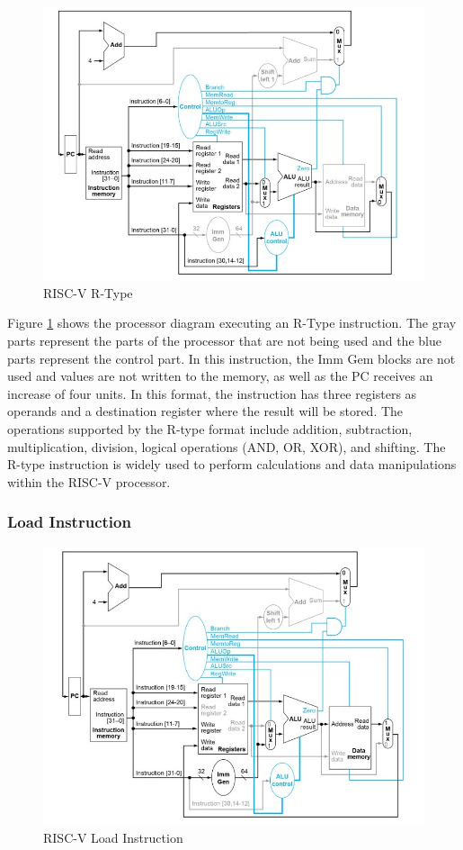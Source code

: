                 \begin{figure}[!h]
                \centering
                \includegraphics[width= 0.8
                \textwidth]{figures/riscv/risc_R-type.jpg}
                    \caption{\label{risc_R-type} RISC-V R-Type}
                \end{figure}
                
                Figure \ref{risc_R-type} shows the processor diagram executing an R-Type instruction. The gray parts represent the parts of the processor that are not being used and the blue parts represent the control part. In this instruction, the Imm Gem blocks are not used and values are not written to the memory, as well as the PC receives an increase of four units.  In this format, the instruction has three registers as operands and a destination register where the result will be stored. The operations supported by the R-type format include addition, subtraction, multiplication, division, logical operations (AND, OR, XOR), and shifting. The R-type instruction is widely used to perform calculations and data manipulations within the RISC-V processor.
            
            \subsubsection{Load Instruction}

                \begin{figure}[!h]
                \centering
                \includegraphics[width= 0.8
                \textwidth]{figures/riscv/risc_L-type.jpg}
                    \caption{\label{risc_L-type} RISC-V Load Instruction}
                \end{figure}

